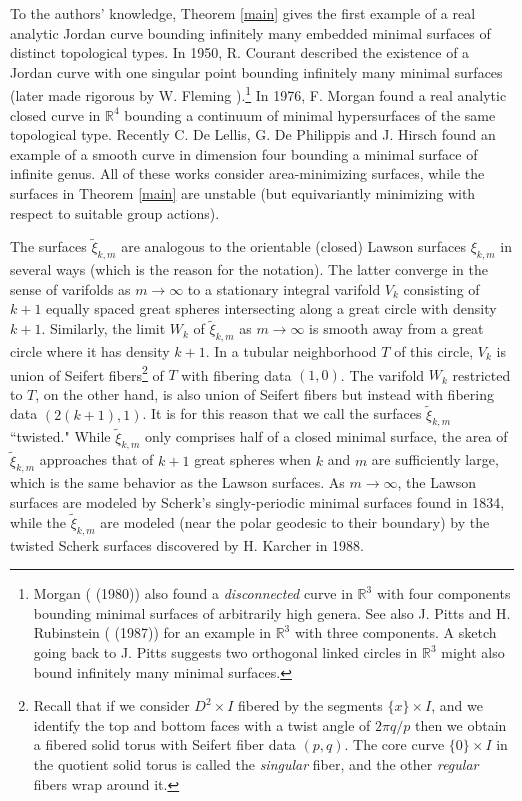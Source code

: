 \documentclass[11pt, reqno]{amsart}
\numberwithin{equation}{section}
\begin{document}
To the authors' knowledge, Theorem \ref{main} gives the first example of a real analytic Jordan curve bounding infinitely many embedded minimal surfaces of distinct topological types.  In 1950, R. Courant \cite{C} described the existence of a Jordan curve with one singular point bounding infinitely many minimal surfaces (later made rigorous by W. Fleming \cite{Fleming}).\footnote{Morgan (\cite{M1} (1980)) also found a \emph{disconnected} curve in $\mathbb{R}^3$ with four components bounding minimal surfaces of arbitrarily high genera.  See also J. Pitts and H. Rubinstein (\cite{PR} (1987)) for an example in $\mathbb{R}^3$ with three components.  A sketch going back to J. Pitts suggests two orthogonal linked circles in $\mathbb{R}^3$ might also bound infinitely many minimal surfaces.} In 1976, F. Morgan \cite{M2} found a real analytic closed curve in $\mathbb{R}^4$ bounding a continuum of minimal hypersurfaces of the same topological type.  Recently C. De Lellis, G. De Philippis and J. Hirsch \cite{DDH} found an example of a smooth curve in dimension four bounding a minimal surface of infinite genus. All of these works consider area-minimizing surfaces, while the surfaces in Theorem \ref{main} are unstable (but equivariantly minimizing with respect to suitable group actions).



The surfaces $\tilde{\xi}_{k,m}$ are analogous to the orientable (closed) Lawson surfaces $\xi_{k,m}$ in several ways (which is the reason for the notation).  The latter converge in the sense of varifolds as $m\to\infty$ to a stationary integral varifold $V_k$ consisting of $k+1$ equally spaced great spheres intersecting along a great circle with density $k+1$. Similarly, the limit $W_k$ of $\tilde{\xi}_{k,m}$ as $m\to\infty$ is smooth away from a great circle where it has density $k+1$.  In a tubular neighborhood $T$ of this circle, $V_k$ is union of Seifert fibers\footnote{Recall that if we consider $D^2\times I$ fibered by the segments $\{x\}\times I$, and we identify the top and bottom faces with a twist angle of $2\pi q/p$ then we obtain a fibered solid torus with Seifert fiber data $(p,q)$. The core curve $\{0\}\times I$ in the quotient solid torus is called the \emph{singular} fiber, and the other \emph{regular} fibers wrap around it.} of $T$ with fibering data $(1,0)$.    The varifold $W_k$ restricted to $T$, on the other hand, is also union of Seifert fibers but instead with fibering data $(2(k+1),1)$.  It is for this reason that we call the surfaces $\tilde{\xi}_{k,m}$ ``twisted."  While $\tilde{\xi}_{k,m}$ only comprises half of a closed minimal surface, the area of $\tilde{\xi}_{k,m}$ approaches that of $k+1$ great spheres when $k$ and $m$ are sufficiently large, which is the same behavior as the Lawson surfaces.  As $m\to\infty$, the Lawson surfaces  are modeled by Scherk's singly-periodic minimal surfaces found in 1834, while the $\tilde{\xi}_{k,m}$ are modeled (near the polar geodesic to their boundary) by the twisted Scherk surfaces discovered by H. Karcher \cite{Karcher} in 1988.  
\end{document}
